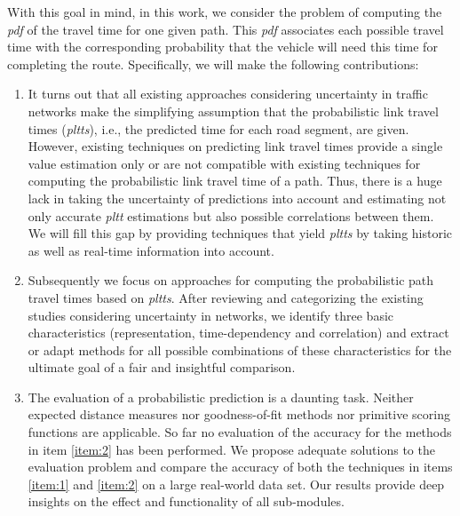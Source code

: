 With this goal in mind, in this work, we consider the problem of computing the \textit{pdf} of the travel time for one given path. This \textit{pdf} associates each possible travel time with the corresponding probability that the vehicle will need this time for completing the route. Specifically, we will make the following contributions:

\begin{enumerate}
\item \label{item:1} It turns out that all existing approaches considering uncertainty in traffic networks make the simplifying assumption that the probabilistic link travel times (\textit{pltts}), i.e., the predicted time for each road segment, are given. However, existing techniques on predicting link travel times provide a single value estimation only or are not compatible with existing techniques for computing the probabilistic link travel time of a path. Thus, there is a huge lack in taking the uncertainty of predictions into account and estimating not only accurate \textit{pltt} estimations but also possible correlations between them. We will fill this gap by providing techniques that yield \textit{pltts} by taking historic as well as real-time information into account.
\item \label{item:2} Subsequently we focus on approaches for computing the probabilistic path travel times based on \textit{pltts}. After reviewing and categorizing the existing studies considering uncertainty in networks, we identify three basic characteristics (representation, time-dependency and correlation) and extract or adapt methods for all possible combinations of these characteristics for the ultimate goal of a fair and insightful comparison.
\item The evaluation  of a probabilistic prediction is a daunting task. Neither expected distance measures nor goodness-of-fit methods nor primitive scoring functions are applicable. So far no evaluation of the accuracy for the methods in item \ref{item:2} has been performed. We propose adequate solutions to the evaluation problem and compare the accuracy of both the techniques in items \ref{item:1} and \ref{item:2} on a large real-world data set. Our results provide deep insights on the effect and functionality of all sub-modules.
\end{enumerate}

